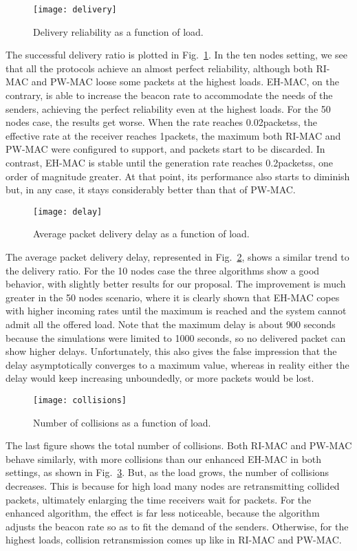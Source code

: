 \documentclass[journal,english,twocolumn,10pt,letterpaper]{IEEEtran}
\begin{document}
\begin{figure}
  \centering
  \texttt{[image: delivery]}
  \caption{Delivery reliability as a function of load.}
  \label{fig:delivery-ratio}
\end{figure}
The successful delivery ratio is plotted in Fig.~\ref{fig:delivery-ratio}. In
the ten nodes setting, we see that all the protocols achieve an almost perfect
reliability, although both RI-MAC and PW-MAC loose some packets at the highest
loads. EH-MAC, on the contrary, is able to increase the beacon rate to
accommodate the needs of the senders, achieving the perfect reliability even
at the highest loads. For the 50 nodes case, the results get worse. When the
rate reaches 0.02packetss, the effective rate at the receiver reaches
1packets, the maximum both RI-MAC and PW-MAC were configured to
support, and packets start to be discarded. In contrast, EH-MAC is stable
until the generation rate reaches 0.2packetss, one order of magnitude
greater. At that point, its performance also starts to diminish but, in any
case, it stays considerably better than that of PW-MAC.

\begin{figure}
  \centering
  \texttt{[image: delay]}
  \caption{Average packet delivery delay as a function of load.}
  \label{fig:delay}
\end{figure}
The average packet delivery delay, represented in Fig.~\ref{fig:delay}, shows
a similar trend to the delivery ratio. For the 10 nodes case the three
algorithms show a good behavior, with slightly better results for our
proposal. The improvement is much greater in the 50 nodes scenario, where it
is clearly shown that EH-MAC copes with higher incoming rates until the
maximum is reached and the system cannot admit all the offered load. Note that
the maximum delay is about 900 seconds because the simulations were limited to
1000 seconds, so no delivered packet can show higher delays. Unfortunately,
this also gives the false impression that the delay asymptotically converges
to a maximum value, whereas in reality either the delay would keep increasing
unboundedly, or more packets would be lost.

\begin{figure}
  \centering
  \texttt{[image: collisions]}
  \caption{Number of collisions as a function of load.}
  \label{fig:collisions}
\end{figure}
The last figure shows the total number of collisions. Both RI-MAC and PW-MAC
behave similarly, with more collisions than our enhanced EH-MAC in both
settings, as shown in Fig.~\ref{fig:collisions}. But, as the load grows, the
number of collisions decreases. This is because for
high load many nodes are retransmitting collided packets,
ultimately enlarging the time receivers wait for packets. For the enhanced
algorithm, the effect is far less noticeable, because the algorithm adjusts
the beacon rate so as to fit the demand of the senders. Otherwise, for the
highest loads, collision retransmission comes up like in RI-MAC and PW-MAC.
\end{document}
